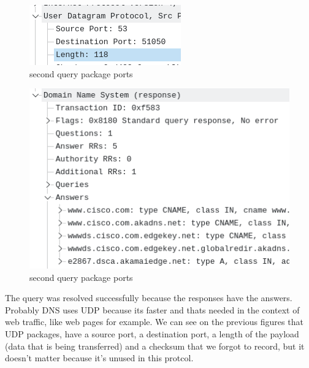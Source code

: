 \begin{figure}[htbp]
	\centering
	\includegraphics[width=1\linewidth]{img/11.png}
	\caption{second query package ports}\label{fig:11}
\end{figure}

\begin{figure}[htbp]
	\centering
	\includegraphics[width=1\linewidth]{img/12.png}
	\caption{second query package ports}\label{fig:12}
\end{figure}

The query was resolved successfully because the responses have the answers.
Probably DNS uses UDP because its faster and thats needed in the context of web
traffic, like web pages for example. We can see on the previous figures that
UDP packages, have a source port, a destination port, a length of the payload
(data that is being transferred) and a checksum that we forgot to record, but
it doesn't matter because it's unused in this protcol.
